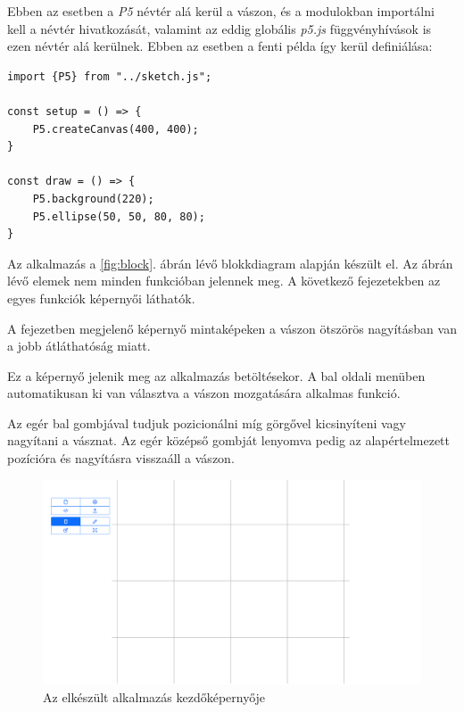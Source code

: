 Ebben az esetben a \textit{P5} névtér alá kerül a vászon, és a modulokban importálni kell a névtér hivatkozását, valamint az eddig globális \textit{p5.js} függvényhívások is ezen névtér alá kerülnek. Ebben az esetben a fenti példa így kerül definiálása:

\begin{lstlisting}[style=es6, morekeywords={P5}]
import {P5} from "../sketch.js";

const setup = () => {
	P5.createCanvas(400, 400);
}

const draw = () => {
	P5.background(220);
	P5.ellipse(50, 50, 80, 80);
}
\end{lstlisting}


Az alkalmazás a \ref{fig:block}. ábrán lévő blokkdiagram alapján készült el. Az ábrán lévő elemek nem minden funkcióban jelennek meg. A következő fejezetekben az egyes funkciók képernyői láthatók. 

A fejezetben megjelenő képernyő mintaképeken a vászon ötszörös nagyításban van a jobb átláthatóság miatt.


Ez a képernyő jelenik meg az alkalmazás betöltésekor. A bal oldali menüben automatikusan ki van választva a vászon mozgatására alkalmas funkció.

Az egér bal gombjával tudjuk pozicionálni míg görgővel kicsinyíteni vagy nagyítani a vásznat. Az egér középső gombját lenyomva pedig az alapértelmezett pozícióra és nagyításra visszaáll a vászon.

\begin{figure}[!h]
	\label{fig:canvas}
	\centering
	\includegraphics[width=\textwidth]{images/editor_canvas.png}
	\caption{Az elkészült alkalmazás kezdőképernyője}
\end{figure}


